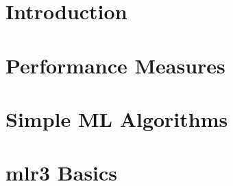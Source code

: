 \documentclass[11pt,compress]{beamer}
\begin{document}


\section{Introduction} %







\section{Performance Measures} %


% 

\section{Simple ML Algorithms} %


%







\section{mlr3 Basics} %

\end{document}
